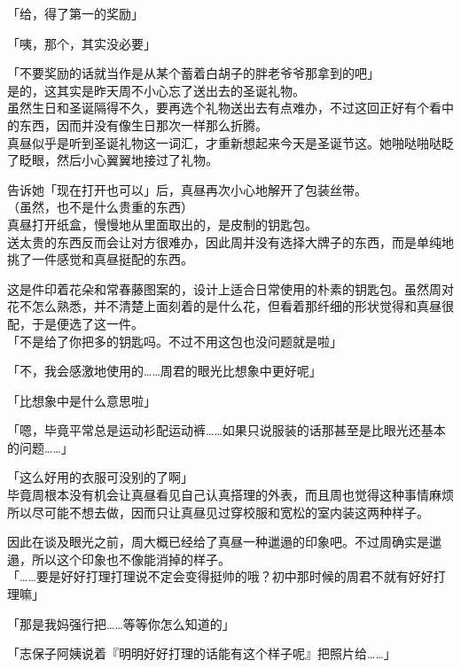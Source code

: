 「给，得了第一的奖励」

「咦，那个，其实没必要」

「不要奖励的话就当作是从某个蓄着白胡子的胖老爷爷那拿到的吧」\\

是的，这其实是昨天周不小心忘了送出去的圣诞礼物。\\

虽然生日和圣诞隔得不久，要再选个礼物送出去有点难办，不过这回正好有个看中的东西，因而并没有像生日那次一样那么折腾。\\

真昼似乎是听到圣诞礼物这一词汇，才重新想起来今天是圣诞节这。她啪哒啪哒眨了眨眼，然后小心翼翼地接过了礼物。

告诉她「现在打开也可以」后，真昼再次小心地解开了包装丝带。\\

（虽然，也不是什么贵重的东西）\\

真昼打开纸盒，慢慢地从里面取出的，是皮制的钥匙包。\\

送太贵的东西反而会让对方很难办，因此周并没有选择大牌子的东西，而是单纯地挑了一件感觉和真昼挺配的东西。

这是件印着花朵和常春藤图案的，设计上适合日常使用的朴素的钥匙包。虽然周对花不怎么熟悉，并不清楚上面刻着的是什么花，但看着那纤细的形状觉得和真昼很配，于是便选了这一件。\\

「不是给了你把多的钥匙吗。不过不用这包也没问题就是啦」

「不，我会感激地使用的……周君的眼光比想象中更好呢」

「比想象中是什么意思啦」

「嗯，毕竟平常总是运动衫配运动裤……如果只说服装的话那甚至是比眼光还基本的问题……」

「这么好用的衣服可没别的了啊」\\

毕竟周根本没有机会让真昼看见自己认真搭理的外表，而且周也觉得这种事情麻烦所以尽可能不想去做，因而只让真昼见过穿校服和宽松的室内装这两种样子。

因此在谈及眼光之前，周大概已经给了真昼一种邋遢的印象吧。不过周确实是邋遢，所以这个印象也不像能消掉的样子。\\

「……要是好好打理打理说不定会变得挺帅的哦？初中那时候的周君不就有好好打理嘛」

「那是我妈强行把……等等你怎么知道的」

「志保子阿姨说着『明明好好打理的话能有这个样子呢』把照片给……」

